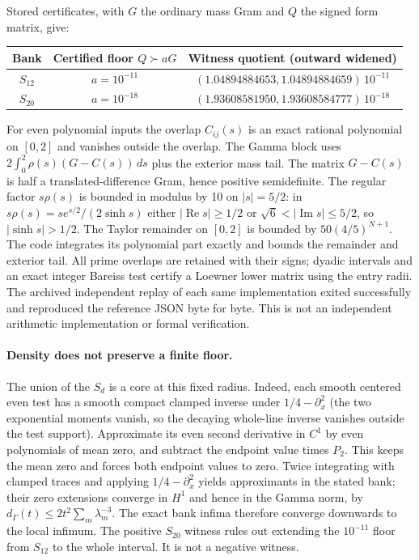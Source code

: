 \documentclass[11pt,a4paper]{article}
\numberwithin{equation}{section}
\theoremstyle{definition}\newtheorem{definition}[theorem]{Definition}
\theoremstyle{remark}\newtheorem{remark}[theorem]{Remark}
\begin{document}
Stored certificates, with $G$ the ordinary mass Gram and $Q$ the signed form matrix, give:
\begin{center}
\begin{tabular}{@{}ccc@{}}\toprule
Bank & Certified floor $Q\succ aG$ & Witness quotient (outward widened)\\\midrule
$S_{12}$ & $a=10^{-11}$ & $(1.04894884653,1.04894884659)\,10^{-11}$\\
$S_{20}$ & $a=10^{-18}$ & $(1.93608581950,1.93608584777)\,10^{-18}$\\\bottomrule
\end{tabular}
\end{center}
For even polynomial inputs the overlap $C_{ij}(s)$ is an exact rational polynomial on $[0,2]$ and vanishes outside the overlap. The Gamma block uses $2\int_0^2\rho(s)(G-C(s))\,ds$ plus the exterior mass tail. The matrix $G-C(s)$ is half a translated-difference Gram, hence positive semidefinite. The regular factor $s\rho(s)$ is bounded in modulus by 10 on $|s|=5/2$: in $s\rho(s)=s e^{s/2}/(2\sinh s)$ either $|\operatorname{Re}s|\ge 1/2$ or $\sqrt6<|\operatorname{Im}s|\le 5/2$, so $|\sinh s|>1/2$. The Taylor remainder on $[0,2]$ is bounded by $50(4/5)^{N+1}$. The code integrates its polynomial part exactly and bounds the remainder and exterior tail. All prime overlaps are retained with their signs; dyadic intervals and an exact integer Bareiss test certify a Loewner lower matrix using the entry radii. The archived independent replay of each same implementation exited successfully and reproduced the reference JSON byte for byte. This is not an independent arithmetic implementation or formal verification.

\paragraph{Density does not preserve a finite floor.}
The union of the $S_d$ is a core at this fixed radius. Indeed, each smooth centered even test has a smooth compact clamped inverse under $1/4-\partial_x^2$ (the two exponential moments vanish, so the decaying whole-line inverse vanishes outside the test support). Approximate its even second derivative in $C^1$ by even polynomials of mean zero, and subtract the endpoint value times $P_2$. This keeps the mean zero and forces both endpoint values to zero. Twice integrating with clamped traces and applying $1/4-\partial_x^2$ yields approximants in the stated bank; their zero extensions converge in $H^1$ and hence in the Gamma norm, by $d_\Gamma(t)\le 2t^2\sum_m\lambda_m^{-3}$. The exact bank infima therefore converge downwards to the local infimum. The positive $S_{20}$ witness rules out extending the $10^{-11}$ floor from $S_{12}$ to the whole interval. It is not a negative witness.
\end{document}
